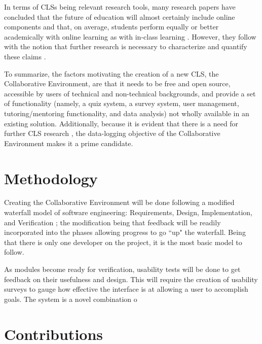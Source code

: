 In terms of CLSs being relevant research tools, many research papers have concluded that the future of education will almost certainly include online components \cite{keeping-pace2-pdf} and that, on average, students perform equally or better academically with online learning as with in-class learning \cite{national-primer-k-12-pdf}. However, they follow with the notion that further research is necessary to characterize and quantify these claims \cite{national-primer-k-12-pdf}.

To summarize, the factors motivating the creation of a new CLS, the Collaborative Environment, are that it needs to be free and open source, accessible by users of technical and non-technical backgrounds, and provide a set of functionality (namely, a quiz system, a survey system, user management, tutoring/mentoring functionality, and data analysis) not wholly available in an existing solution. Additionally, because it is evident that there is a need for further CLS research \cite{keeping-pace2-pdf, national-primer-k-12-pdf}, the data-logging objective of the Collaborative Environment makes it a prime candidate.

\section{Methodology}
\label{sec:methodology}

Creating the Collaborative Environment will be done following a modified waterfall model of software engineering: Requirements, Design, Implementation, and Verification \cite{stober2010agile}; the modification being that feedback will be readily incorporated into the phases allowing progress to go ``up" the waterfall. Being that there is only one developer on the project, it is the most basic model to follow.

As modules become ready for verification, usability tests will be done to get feedback on their usefulness and design. This will require the creation of usability surveys to gauge how effective the interface is at allowing a user to accomplish goals. The system is a novel combination o

\section{Contributions}
\label{sec:objectives}

